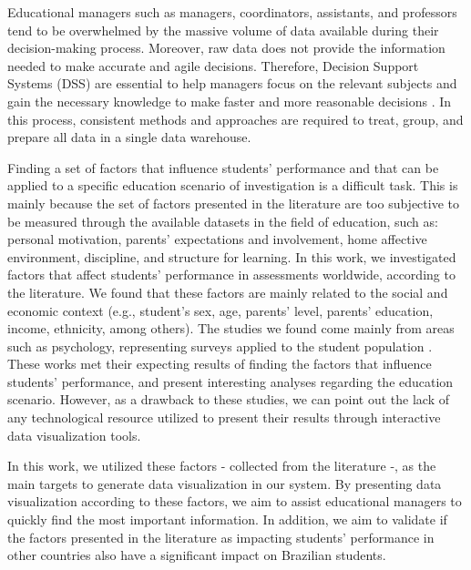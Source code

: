 \documentclass[12pt]{article}
\begin{document}
Educational managers such as managers, coordinators, assistants, and professors
tend to be overwhelmed by the massive volume of data available during their decision-making process. Moreover, raw data does not provide the information needed to make accurate and agile decisions. Therefore, Decision Support Systems (DSS) are essential to help managers focus on the relevant subjects and gain the necessary knowledge to make faster and more reasonable decisions \cite{Velasco2020,RoqueeFaria2019}. In this process, consistent methods and approaches are required to
treat, group, and prepare all data in a single data warehouse.

Finding a set of factors that influence students' performance and that can be applied to a specific education scenario of investigation is a difficult task. This is mainly because the set of factors presented in the literature are too subjective to be measured through the available datasets in the field of education, such as: personal motivation, parents' expectations and involvement, home affective environment, discipline, and structure for learning. 
In this work, we investigated factors that affect students' performance in assessments worldwide, according to the literature. We found that these factors are mainly related to the social and economic context (e.g., student's sex, age, parents' level, parents' education, income, ethnicity, among others). The studies we found come mainly from areas such as psychology, representing surveys applied to the student population \cite{Farooq2012FACTORSAS, Stewart2007}. These works met their expecting results of finding the factors that influence students' performance, and present interesting analyses regarding the education scenario. However, as a drawback to these studies, we can point out the lack of any technological resource utilized to present their results through interactive data visualization tools.    


In this work, we utilized these factors - collected from the literature -, as the main targets to generate data visualization in our system. By presenting data visualization according to these factors, we aim to assist educational managers to quickly find the most important information. In addition, we aim to validate if the factors presented in the literature as impacting students' performance in other countries also have a significant impact on Brazilian students.
\end{document}
